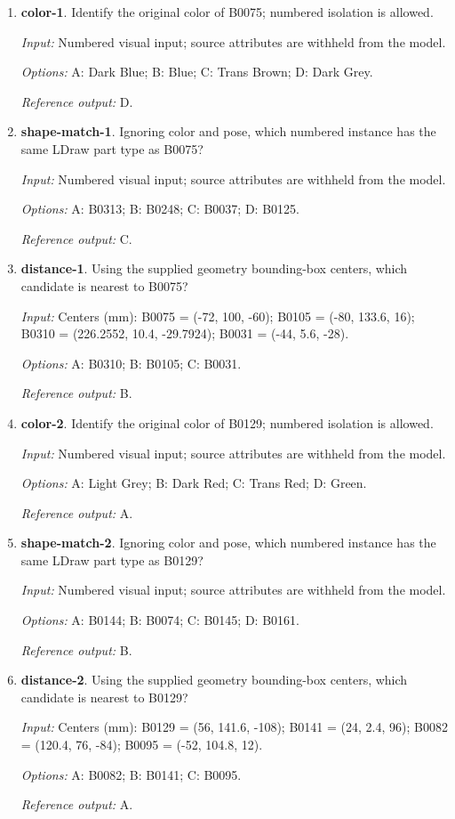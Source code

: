 \begin{enumerate}
\item \textbf{color-1}. Identify the original color of B0075; numbered isolation is allowed.\par {\small \textit{Input:} Numbered visual input; source attributes are withheld from the model. \par\textit{Options:} A: Dark Blue; B: Blue; C: Trans Brown; D: Dark Grey. \par\textit{Reference output:} D.}
\item \textbf{shape-match-1}. Ignoring color and pose, which numbered instance has the same LDraw part type as B0075?\par {\small \textit{Input:} Numbered visual input; source attributes are withheld from the model. \par\textit{Options:} A: B0313; B: B0248; C: B0037; D: B0125. \par\textit{Reference output:} C.}
\item \textbf{distance-1}. Using the supplied geometry bounding-box centers, which candidate is nearest to B0075?\par {\small \textit{Input:} Centers (mm): B0075 = (-72, 100, -60); B0105 = (-80, 133.6, 16); B0310 = (226.2552, 10.4, -29.7924); B0031 = (-44, 5.6, -28). \par\textit{Options:} A: B0310; B: B0105; C: B0031. \par\textit{Reference output:} B.}
\item \textbf{color-2}. Identify the original color of B0129; numbered isolation is allowed.\par {\small \textit{Input:} Numbered visual input; source attributes are withheld from the model. \par\textit{Options:} A: Light Grey; B: Dark Red; C: Trans Red; D: Green. \par\textit{Reference output:} A.}
\item \textbf{shape-match-2}. Ignoring color and pose, which numbered instance has the same LDraw part type as B0129?\par {\small \textit{Input:} Numbered visual input; source attributes are withheld from the model. \par\textit{Options:} A: B0144; B: B0074; C: B0145; D: B0161. \par\textit{Reference output:} B.}
\item \textbf{distance-2}. Using the supplied geometry bounding-box centers, which candidate is nearest to B0129?\par {\small \textit{Input:} Centers (mm): B0129 = (56, 141.6, -108); B0141 = (24, 2.4, 96); B0082 = (120.4, 76, -84); B0095 = (-52, 104.8, 12). \par\textit{Options:} A: B0082; B: B0141; C: B0095. \par\textit{Reference output:} A.}

\end{enumerate}
